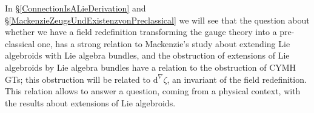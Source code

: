 \documentclass[preprint]{elsarticle}
\theoremstyle{plain}
\theoremstyle{remark}
\theoremstyle{definition}
\begin{document}
In \S \ref{ConnectionIsALieDerivation} 
and \S \ref{MackenzieZeugsUndExistenzvonPreclassical} we will see that the question about whether we have a field redefinition transforming the gauge theory into a pre-classical one, has a strong relation to Mackenzie's study about extending Lie algebroids with Lie algebra bundles, and the obstruction of extensions of Lie algebroids by Lie algebra bundles have a relation to the obstruction of CYMH GTs; this obstruction will be related to $\mathrm{d}^\nabla \zeta$, an invariant of the field redefinition.
This relation allows to answer a question, coming from a physical context, with the results about extensions of Lie algebroids.
%
%
%
\end{document}
